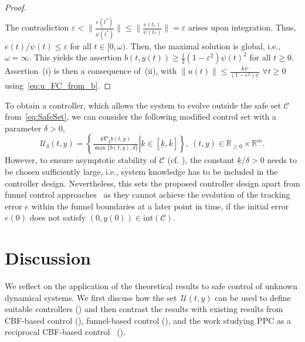 \documentclass[journal,twoside,web]{ieeeconf}
\newcommand{\R}{\mathbb{R}}
\begin{document}
\begin{proof}
\begin{equation*}
\begin{aligned}
        \end{aligned}
    \end{equation*}
    The contradiction $\varepsilon < \|\tfrac{e(t^*)}{\psi(t^*)}\| \le \|\tfrac{e(t_*)}{\psi(t_*)}\| = \varepsilon$ arises upon integration. Thus, $e(t)/\psi(t) \le \varepsilon$ for all $t \in [0,\omega)$. 
    Then, the maximal solution is global, i.e., $\omega=\infty$.
    This yields the assertion $b(t,y(t)) \ge \tfrac12 (1-\varepsilon^2) \psi(t)^2$ for all $t \ge 0$.
    Assertion~(i) is then a consequence of~(ii), with ${\|u(t)\|\leq \tfrac{\bar{k}\bar{\psi}}{(1-\varepsilon^2)\underline{\psi}}}$ $\forall t\geq 0$ using~\eqref{eq:u_FC_from_b}.
\end{proof}
%
To obtain a controller, which allows the system to evolve outside the safe set $\mathcal{C}$ from~\eqref{eq:SafeSet}, we can consider the following modified control set with a parameter $\delta>0$,
\begin{equation} \label{eq:u_FC_saturated}
    \mathcal{U}_\delta(t,y) \!=\! \left\{ \! \left.  \! \tfrac{k \nabla_y b(t,y)}{\max\{b(t,y),\delta\}}  \right| 
          k \!\in\! [\underline{k},\overline{k}] \! \right\}\!, \ (t,y) \!\in \! \R_{\geq0} \! \times \! \R^m\!.
\end{equation}
However, to ensure asymptotic stability of $\mathcal{C}$ (cf. \cite[Prop.~2]{ames2016control}), the constant $\underline{k}/\delta > 0$ needs to be chosen sufficiently large, i.e., system knowledge has to be included in the controller design. 
Nevertheless, this sets the proposed controller design apart 
from funnel control approaches~\cite{IlchRyan02b,berger2018funnel,BergIlch21} 
as they cannot achieve the evolution of the tracking error $e$ within the funnel 
boundaries at a later point in time, if the initial error $e(0)$ does not satisfy $(0,y(0)) \in \mathrm{int}(\mathcal{C})$.

\section{Discussion} \label{Sec:Discussion}
We reflect on the application of the theoretical results to safe control of unknown dynamical systems. We first discuss how the set~$\mathcal{U}(t,y)$ can be used to define suitable controllers () and then contrast the results with existing results from CBF-based control (), funnel-based control (), and the work studying PPC as a reciprocal CBF-based control~\cite{namerikawa2024equivalence} (). 
\end{document}

